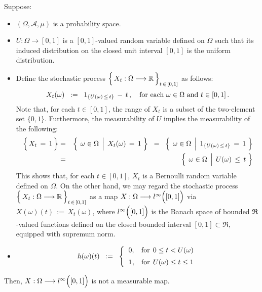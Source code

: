 \begin{example}
\mbox{}\vskip 0.1cm
\noindent
Suppose:
\begin{itemize}
\item
	$(\Omega,\mathcal{A},\mu)$ is a probability space.
\item
	$U : \Omega \longrightarrow [0,1]$ is a $[0,1]$-valued random variable
	defined on $\Omega$ such that its induced distribution on the closed
	unit interval $[0,1]$ is the uniform distribution.
\item
	Define the stochastic process
	$\left\{\, X_{t} : \Omega \overset{{\color{white}-}}{\longrightarrow} \Re \,\right\}_{t\,\in\,[0,1]}$
	as follows:
	\begin{equation*}
	X_{t}(\omega)
	\;\; := \;\;
		1_{\{U(\omega)\,\leq\,t\}} \, - \, t \,,
	\quad
	\textnormal{for each $\omega \in \Omega$ and $t \in [0,1]$}\,.
	\end{equation*}
	Note that, for each $t \in [0,1]$, the range of $X_{t}$ is a subset of the
	two-element set $\{0,1\}$.
	Furthermore, the measurability of $U$ implies the measurability of the following:
	\begin{eqnarray*}
	\left\{\,X_{t} \,\overset{{\color{white}+}}{=}\, 1\,\right\}
	& = &
		\left\{\;
			\left.
			\overset{{\color{white}+}}{\omega}\in\Omega
			\;\,\right\vert\;
			X_{t}(\omega) \,\overset{{\color{white}+}}{=}\, 1
			\;\right\}
	\;\; = \;\;
		\left\{\;
			\left.
			\overset{{\color{white}+}}{\omega}\in\Omega
			\;\,\right\vert\;
			1_{\{U(\omega)\,\leq\,t\}} \,=\, 1
			\;\right\}
	\\
	& = &
		\left\{\;
			\left.
			\overset{{\color{white}+}}{\omega}\in\Omega
			\;\,\right\vert\;
			U(\omega)\,\leq\,t
			\;\right\}
	\end{eqnarray*}	
	This shows that, for each $t\in[0,1]$, $X_{t}$ is a Bernoulli random variable defined on $\Omega$.
	On the other hand, we may regard the stochastic process
	$\left\{\, X_{t} : \Omega \overset{{\color{white}-}}{\longrightarrow} \Re \,\right\}_{t\,\in\,[0,1]}$
	as a map
	$X : \Omega \longrightarrow l^{\infty}\!\left([\overset{{\color{white}.}}{0},1]\right)$
	via \,$X(\omega)(t) \, := \, X_{t}(\omega)$,
	where  
	$l^{\infty}\!\left([\overset{{\color{white}.}}{0},1]\right)$
	is the Banach space of bounded $\Re$-valued functions defined on
	the closed bounded interval $[0,1] \subset \Re$, equipped with supremum norm.
\item
	\begin{equation*}
	h(\omega)(t)
	\;\; := \;\;
		\left\{\begin{array}{cc}
		0, & \textnormal{for} \;\, 0 \leq t < U(\omega)
		\\
		\overset{{\color{white}+}}{1}, & \textnormal{for} \;\, U(\omega) \leq t \leq 1
		\end{array}\right.
	\end{equation*}
\end{itemize}
Then,
$X : \Omega \longrightarrow l^{\infty}\!\left([\overset{{\color{white}.}}{0},1]\right)$
is not a measurable map.
\end{example}
